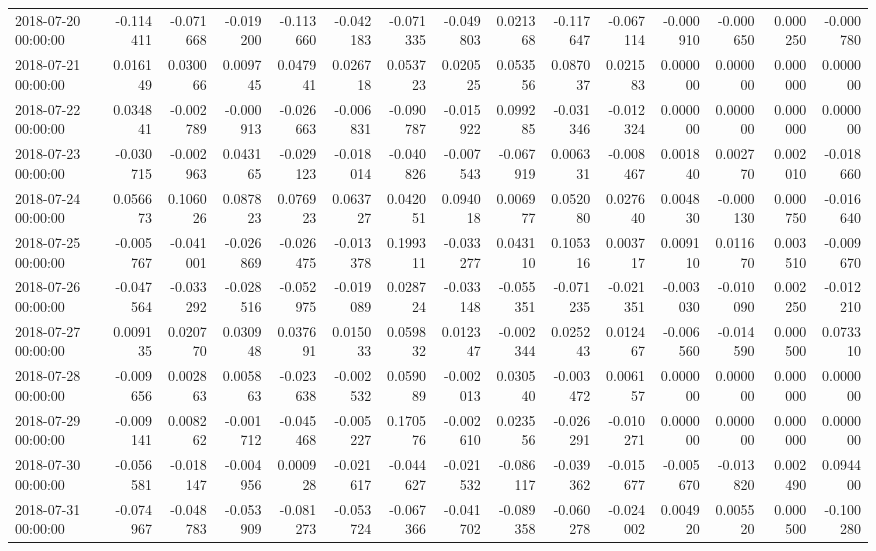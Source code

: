 \begin{tabular}{lrrrrrrrrrrrrrr}
2018-07-20 00:00:00 & -0.114411 & -0.071668 & -0.019200 & -0.113660 & -0.042183 & -0.071335 & -0.049803 & 0.021368 & -0.117647 & -0.067114 & -0.000910 & -0.000650 & 0.000250 & -0.000780 \\
2018-07-21 00:00:00 & 0.016149 & 0.030066 & 0.009745 & 0.047941 & 0.026718 & 0.053723 & 0.020525 & 0.053556 & 0.087037 & 0.021583 & 0.000000 & 0.000000 & 0.000000 & 0.000000 \\
2018-07-22 00:00:00 & 0.034841 & -0.002789 & -0.000913 & -0.026663 & -0.006831 & -0.090787 & -0.015922 & 0.099285 & -0.031346 & -0.012324 & 0.000000 & 0.000000 & 0.000000 & 0.000000 \\
2018-07-23 00:00:00 & -0.030715 & -0.002963 & 0.043165 & -0.029123 & -0.018014 & -0.040826 & -0.007543 & -0.067919 & 0.006331 & -0.008467 & 0.001840 & 0.002770 & 0.002010 & -0.018660 \\
2018-07-24 00:00:00 & 0.056673 & 0.106026 & 0.087823 & 0.076923 & 0.063727 & 0.042051 & 0.094018 & 0.006977 & 0.052080 & 0.027640 & 0.004830 & -0.000130 & 0.000750 & -0.016640 \\
2018-07-25 00:00:00 & -0.005767 & -0.041001 & -0.026869 & -0.026475 & -0.013378 & 0.199311 & -0.033277 & 0.043110 & 0.105316 & 0.003717 & 0.009110 & 0.011670 & 0.003510 & -0.009670 \\
2018-07-26 00:00:00 & -0.047564 & -0.033292 & -0.028516 & -0.052975 & -0.019089 & 0.028724 & -0.033148 & -0.055351 & -0.071235 & -0.021351 & -0.003030 & -0.010090 & 0.002250 & -0.012210 \\
2018-07-27 00:00:00 & 0.009135 & 0.020770 & 0.030948 & 0.037691 & 0.015033 & 0.059832 & 0.012347 & -0.002344 & 0.025243 & 0.012467 & -0.006560 & -0.014590 & 0.000500 & 0.073310 \\
2018-07-28 00:00:00 & -0.009656 & 0.002863 & 0.005863 & -0.023638 & -0.002532 & 0.059089 & -0.002013 & 0.030540 & -0.003472 & 0.006157 & 0.000000 & 0.000000 & 0.000000 & 0.000000 \\
2018-07-29 00:00:00 & -0.009141 & 0.008262 & -0.001712 & -0.045468 & -0.005227 & 0.170576 & -0.002610 & 0.023556 & -0.026291 & -0.010271 & 0.000000 & 0.000000 & 0.000000 & 0.000000 \\
2018-07-30 00:00:00 & -0.056581 & -0.018147 & -0.004956 & 0.000928 & -0.021617 & -0.044627 & -0.021532 & -0.086117 & -0.039362 & -0.015677 & -0.005670 & -0.013820 & 0.002490 & 0.094400 \\
2018-07-31 00:00:00 & -0.074967 & -0.048783 & -0.053909 & -0.081273 & -0.053724 & -0.067366 & -0.041702 & -0.089358 & -0.060278 & -0.024002 & 0.004920 & 0.005520 & 0.000500 & -0.100280 \\

\end{tabular}
